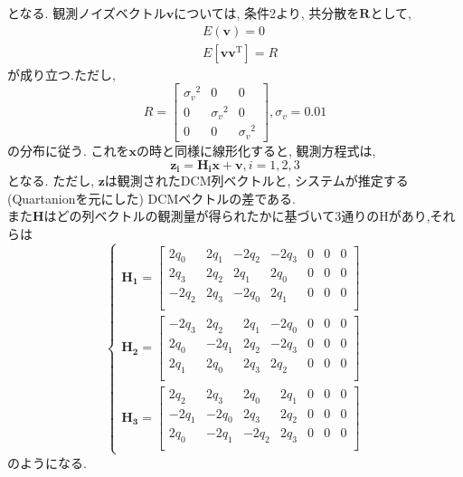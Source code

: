 \documentclass[dvipdfmx, fleqn, uplatex, a4paper]{jsarticle}
\begin{document}
となる.
観測ノイズベクトル$\bm{v}$については, 条件2より, 共分散を$\bm{R}$として,
\begin{align}
   &E(\bm{v}) = 0 \\
   &E[\bm{v}{\bm{v}}^{\mathrm{T}}] = R
\end{align}
が成り立つ.ただし,
\begin{equation}
   R =
  \begin{bmatrix}
    {\sigma_v}^2 & 0 & 0 \\
    0 & {\sigma_v}^2 & 0 \\
    0 & 0 & {\sigma_v}^2
  \end{bmatrix}
  ,  {\sigma_v} = 0.01
\end{equation}
の分布に従う. これを$\bm{x}$の時と同様に線形化すると, 観測方程式は,
\begin{equation}
  \bm{z_i} = \bm{H_i}\bm{x} + \bm{v}, i=1,2,3
\end{equation}
となる. ただし, $\bm{z}$は観測されたDCM列ベクトルと, システムが推定する(Quartanionを元にした)
DCMベクトルの差である. \\
また$\bm{H}$はどの列ベクトルの観測量が得られたかに基づいて3通りのHがあり,それらは
\begin{equation}
  \begin{cases}
  \bm{H_1} =
  \begin{bmatrix}
    2q_0 & 2q_1 & -2q_2 & -2q_3 & 0 & 0 & 0 \\
    2q_3 & 2q_2 & 2q_1 & 2q_0 & 0 & 0 & 0 \\
    -2q_2 & 2q_3 & -2q_0 & 2q_1 & 0 & 0 & 0 \\
  \end{bmatrix} \\
  \bm{H_2} =
  \begin{bmatrix}
    -2q_3 & 2q_2 & 2q_1 & -2q_0 & 0 & 0 & 0 \\
    2q_0 & -2q_1 & 2q_2 & -2q_3 & 0 & 0 & 0 \\
    2q_1 & 2q_0 & 2q_3 & 2q_2 & 0 & 0 & 0 \\
  \end{bmatrix} \\
  \bm{H_3} =
  \begin{bmatrix}
    2q_2 & 2q_3 & 2q_0 & 2q_1 & 0 & 0 & 0 \\
    -2q_1 & -2q_0 & 2q_3 & 2q_2 & 0 & 0 & 0 \\
    2q_0 & -2q_1 & -2q_2 & 2q_3 & 0 & 0 & 0 \\
  \end{bmatrix}
  \end{cases}
\end{equation}
のようになる.
\end{document}

